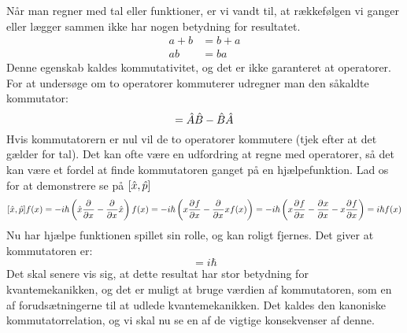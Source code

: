 \documentclass[../Kvantemekanik.tex]{subfiles}
\begin{document}
Når man regner med tal eller funktioner, er vi vandt til, at rækkefølgen vi ganger eller lægger sammen ikke har nogen betydning for resultatet.
\begin{align*}
a+b&=b+a\\
ab &= ba
\end{align*}
Denne egenskab kaldes kommutativitet, og det er ikke garanteret at operatorer. For at undersøge om to operatorer kommuterer udregner man den såkaldte kommutator:
\begin{equation}
[\op A,\op B] = \op A \op B-\op B \op A
\end{equation}
Hvis kommutatorern er nul vil de to operatorer kommutere (tjek efter at det gælder for tal). Det kan ofte være en udfordring at regne med operatorer, så det kan være et fordel at finde kommutatoren ganget på en hjælpefunktion. Lad os for at demonstrere se på $[\op x,\op p]$
$$
[\op x,\op p] f(x) = -i\hbar\left(\op x\pdif{x}{}-\pdif{x}{}\op x\right) f(x) = -i \hbar \left(x\pdif{x}{f}-\pdif{x}{}xf(x)\right)=-i\hbar \left(x\pdif{x}{f}-\pdif{x}{x}-x\pdif{x}{f}\right) = i\hbar f(x)
$$
Nu har hjælpe funktionen spillet sin rolle, og kan roligt fjernes. Det giver at kommutatoren er:
\begin{equation}
[\op x,\op p] = i\hbar
\label{kvant:eq:kankom}
\end{equation}
Det skal senere vis sig, at dette resultat har stor betydning for kvantemekanikken, og det er muligt at bruge værdien af kommutatoren, som en af forudsætningerne til at udlede kvantemekanikken.
Det kaldes den kanoniske kommutatorrelation, og vi skal nu se en af de vigtige konsekvenser af denne.
\end{document}
